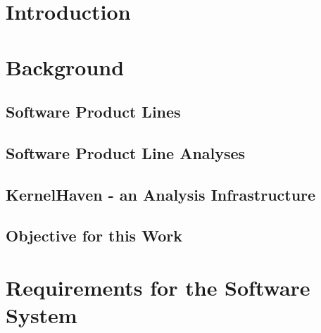\documentclass[a4paper]{article}
\begin{document}
\newpage
\lhead{{}}
\rhead{\leftmark}
\pagestyle{fancy}

\listoftodos[Notes]
\clearpage

\tableofcontents
\newpage


\maketitle
\newpage

\setcounter{page}{1}
\lhead{{}}
\rhead{\leftmark}
\pagestyle{fancy}



\section{Introduction}


\section{Background}
\subsection{Software Product Lines}

\subsection{Software Product Line Analyses}

\subsection{KernelHaven - an Analysis Infrastructure}\label{kernelhaven}



\subsection{Objective for this Work}


\clearpage
\section{Requirements for the Software System}
\end{document}
